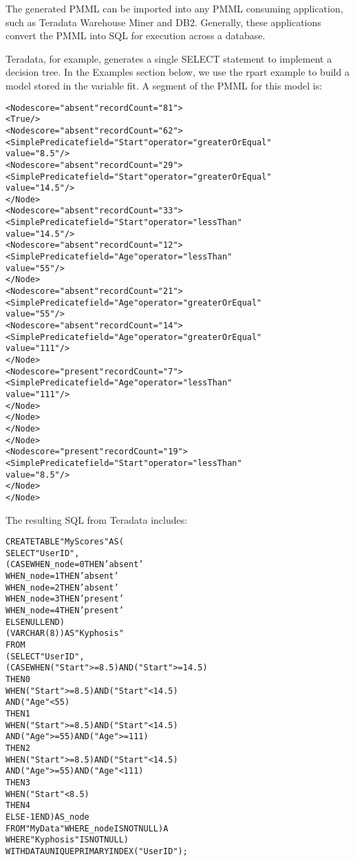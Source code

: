 \begin{Details}\relax
The generated PMML can be imported into any PMML consuming
application, such as Teradata Warehouse Miner and DB2. Generally,
these applications convert the PMML into SQL for execution across a
database.

Teradata, for example, generates a single SELECT statement to
implement a decision tree. In the Examples section below, we use the
rpart example to build a model stored in the variable fit. A segment
of the PMML for this model is:

\begin{alltt}
  <Node score="absent" recordCount="81">
   <True/>
   <Node score="absent" recordCount="62">
    <SimplePredicate field="Start" operator="greaterOrEqual"
                     value="8.5"/>
    <Node score="absent" recordCount="29">
     <SimplePredicate field="Start" operator="greaterOrEqual"
                      value="14.5"/>
    </Node>
    <Node score="absent" recordCount="33">
     <SimplePredicate field="Start" operator="lessThan"
                      value="14.5"/>
     <Node score="absent" recordCount="12">
      <SimplePredicate field="Age" operator="lessThan"
                       value="55"/>
     </Node>
     <Node score="absent" recordCount="21">
      <SimplePredicate field="Age" operator="greaterOrEqual" 
                      value="55"/>
      <Node score="absent" recordCount="14">
       <SimplePredicate field="Age" operator="greaterOrEqual"
                        value="111"/>
      </Node>
      <Node score="present" recordCount="7">
       <SimplePredicate field="Age" operator="lessThan"
                        value="111"/>
      </Node>
     </Node>
    </Node>
   </Node>
   <Node score="present" recordCount="19">
    <SimplePredicate field="Start" operator="lessThan"
                     value="8.5"/>
   </Node>
  </Node>
\end{alltt}

The resulting SQL from Teradata includes:

\begin{alltt}
  CREATE TABLE "MyScores" AS (
    SELECT "UserID",
      (CASE WHEN \_node = 0 THEN 'absent'
            WHEN \_node = 1 THEN 'absent'
            WHEN \_node = 2 THEN 'absent'
            WHEN \_node = 3 THEN 'present'
            WHEN \_node = 4 THEN 'present'
            ELSE NULL END)
            (VARCHAR(8)) AS "Kyphosis"
    FROM
      (SELECT "UserID",
        (CASE WHEN ("Start" >= 8.5) AND ("Start" >= 14.5)
              THEN 0
              WHEN ("Start" >= 8.5) AND ("Start" < 14.5)
              AND ("Age" < 55)
              THEN 1
              WHEN ("Start" >= 8.5) AND ("Start" < 14.5)
              AND ("Age" >= 55) AND ("Age" >= 111)
              THEN 2
              WHEN ("Start" >= 8.5) AND ("Start" < 14.5)
              AND ("Age" >= 55) AND ("Age" < 111)
              THEN 3
              WHEN ("Start" < 8.5)
              THEN 4
              ELSE -1 END) AS \_node
        FROM "MyData" WHERE \_node IS NOT NULL) A
        WHERE "Kyphosis" IS NOT NULL)
    WITH DATA UNIQUE PRIMARY INDEX ("UserID");
\end{alltt}
\end{Details}
